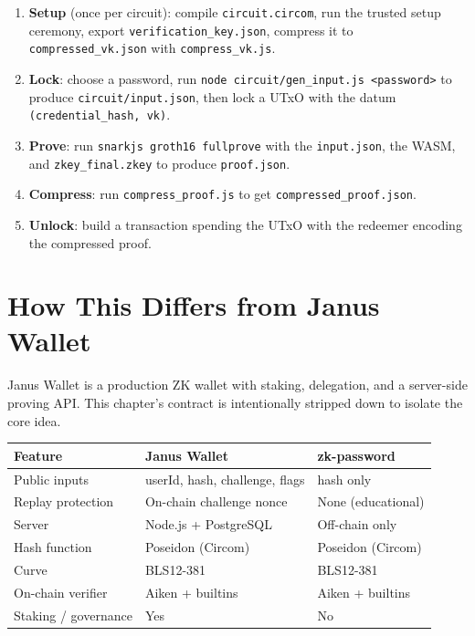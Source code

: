 \begin{enumerate}
  \item \textbf{Setup} (once per circuit): compile \texttt{circuit.circom},
        run the trusted setup ceremony, export \texttt{verification\_key.json},
        compress it to \texttt{compressed\_vk.json} with \texttt{compress\_vk.js}.
  \item \textbf{Lock}: choose a password, run
        \texttt{node circuit/gen\_input.js <password>} to produce
        \texttt{circuit/input.json}, then lock a UTxO with the datum
        \texttt{(credential\_hash, vk)}.
  \item \textbf{Prove}: run \texttt{snarkjs groth16 fullprove} with the
        \texttt{input.json}, the WASM, and \texttt{zkey\_final.zkey}
        to produce \texttt{proof.json}.
  \item \textbf{Compress}: run \texttt{compress\_proof.js} to get
        \texttt{compressed\_proof.json}.
  \item \textbf{Unlock}: build a transaction spending the UTxO with the
        redeemer encoding the compressed proof.
\end{enumerate}

\section{How This Differs from Janus Wallet} \label{sec:ch6-vs-janus}

Janus Wallet is a production ZK wallet with staking, delegation, and a
server-side proving API. This chapter's contract is intentionally stripped down
to isolate the core idea.

\begin{center}
\begin{tabular}{lll}
  \hline
  \textbf{Feature}            & \textbf{Janus Wallet}            & \textbf{zk-password} \\
  \hline
  Public inputs               & userId, hash, challenge, flags   & hash only            \\
  Replay protection           & On-chain challenge nonce         & None (educational)   \\
  Server                      & Node.js + PostgreSQL             & Off-chain only       \\
  Hash function               & Poseidon (Circom)                & Poseidon (Circom)    \\
  Curve                       & BLS12-381                        & BLS12-381            \\
  On-chain verifier           & Aiken + builtins                 & Aiken + builtins     \\
  Staking / governance        & Yes                              & No                   \\
  \hline
\end{tabular}
\end{center}

